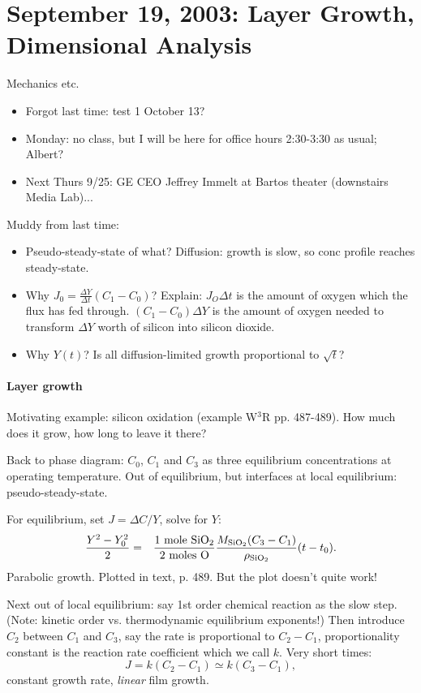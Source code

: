 \documentclass{report}
\begin{document}
\section{September 19, 2003: Layer Growth, Dimensional Analysis}

Mechanics etc.
\begin{itemize}
\item Forgot last time: test 1 October 13?
\item Monday: no class, but I will be here for office hours 2:30-3:30 as usual;
  Albert?
\item Next Thurs 9/25: GE CEO Jeffrey Immelt at Bartos theater (downstairs
  Media Lab)...
\end{itemize}

\noindent Muddy from last time:
\begin{itemize}
\item Pseudo-steady-state of what?  Diffusion: growth is slow, so conc profile
  reaches steady-state.
\item Why $J_0 = \frac{\Delta Y}{\Delta t}(C_1-C_0)$?  Explain: $J_O\Delta t$
  is the amount of oxygen which the flux has fed through.  $(C_1-C_0)\Delta Y$
  is the amount of oxygen needed to transform $\Delta Y$ worth of silicon into
  silicon dioxide.
\item Why $Y(t)$?  Is all diffusion-limited growth proportional to $\sqrt{t}$?
\end{itemize}

\paragraph{Layer growth}

Motivating example: silicon oxidation (example W$^3$R pp. 487-489).  How much
does it grow, how long to leave it there?

Back to phase diagram: $C_0$, $C_1$ and $C_3$ as three equilibrium
concentrations at operating temperature.  Out of equilibrium, but interfaces at
local equilibrium: pseudo-steady-state.

For equilibrium, set $J=\Delta C/Y$, solve for $Y$:
\begin{eqnarray}
  \label{eq:parabolicgrowth2}
  \frac{Y^2-Y_0^2}{2} &=& \frac{\rm 1\ mole\ SiO_2}{\rm 2\ moles\ O}
  \frac{M_{\rm SiO_2} (C_3-C_1)}{\rho_{\rm SiO_2}} (t-t_0).
\end{eqnarray}
Parabolic growth.  Plotted in text, p. 489.  But the plot doesn't quite work!

Next out of local equilibrium: say 1st order chemical reaction as the slow
step.  (Note: kinetic order vs. thermodynamic equilibrium exponents!)  Then
introduce $C_2$ between $C_1$ and $C_3$, say the rate is proportional to
$C_2-C_1$, proportionality constant is the reaction rate coefficient which we
call $k$.  Very short times:
$$J = k(C_2-C_1) \simeq k(C_3-C_1),$$
constant growth rate, {\em linear} film growth.
\end{document}
